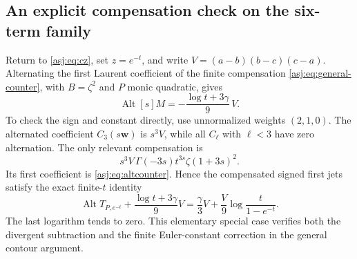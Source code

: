 \subsection{An explicit compensation check on the six-term family}
Return to \eqref{asj:eq:cz}, set $z=e^{-t}$, and write
$V=(a-b)(b-c)(c-a)$. Alternating the first Laurent coefficient of the
finite compensation \eqref{asj:eq:general-counter}, with $B=\zeta^2$ and
$P$ monic quadratic, gives
\begin{equation}\label{asj:eq:altcounter}
 \operatorname{Alt}[s]M=-\frac{\log t+3\gamma}{9}\,V.
\end{equation}
To check the sign and constant directly, use unnormalized weights
$(2,1,0)$. The alternated coefficient $C_3(s\boldsymbol w)$ is
$s^3V$, while all $C_\ell$ with $\ell<3$ have zero alternation.
The only relevant compensation is
\[
 s^3V\,\Gamma(-3s)t^{3s}\zeta(1+3s)^2.
\]
Its first coefficient is \eqref{asj:eq:altcounter}. Hence the compensated
signed first jets satisfy the exact finite-$t$ identity
\begin{equation}\label{asj:eq:altfinite}
 \operatorname{Alt}T_{P,e^{-t}}+\frac{\log t+3\gamma}{9}V
  =\frac\gamma3V+\frac{V}{9}\log\frac{t}{1-e^{-t}}.
\end{equation}
The last logarithm tends to zero. This elementary special case verifies
both the divergent subtraction and the finite Euler-constant correction
in the general contour argument.
